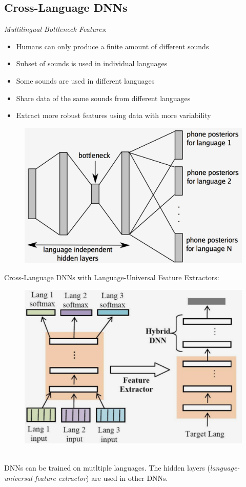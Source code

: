 \subsection{Cross-Language DNNs}
\label{ssect:cross-language-dnns}
\textit{Multilingual Bottleneck Features}:
\begin{itemize}
	\item Humans can only produce a finite amount of different sounds
	\item Subset of sounds is used in individual languages
	\item Some sounds are used in different languages
	\item Share data of the same sounds from different languages
	\item Extract more robust features using data with more variability
\end{itemize}
\begin{figure}[h]
\includegraphics[scale=0.4]{multilingual-bottleneck-features}
\end{figure}
Cross-Language DNNs with Language-Universal Feature Extractors:
\begin{figure}[h]
\includegraphics[scale=0.4]{DNNs-LUFE}
\end{figure}\\
DNNs can be trained on mutltiple languages. The hidden layers (\textit{language-universal feature extractor}) are used in other DNNs.

\newpage